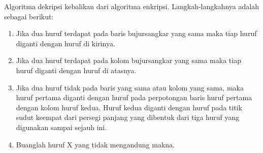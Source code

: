 \documentclass{article}
\begin{document}

Algoritma dekripsi kebalikan dari algoritma enkripsi. Langkah-langkahnya adalah sebagai berikut:

\begin{enumerate}
  \item Jika dua huruf terdapat pada baris bujursangkar yang sama maka tiap huruf diganti dengan huruf di kirinya.
  \item Jika dua huruf terdapat pada kolom bujursangkar yang sama maka tiap huruf diganti dengan huruf di atasnya.
  \item Jika dua huruf tidak pada baris yang sama atau kolom yang sama, maka huruf pertama diganti dengan huruf pada perpotongan baris huruf pertama dengan kolom huruf kedua. Huruf kedua diganti dengan huruf pada titik sudut keempat dari persegi panjang yang dibentuk dari tiga huruf yang digunakan sampai sejauh ini.
  \item Buanglah huruf X yang tidak mengandung makna.
\end{enumerate}
\end{document}

